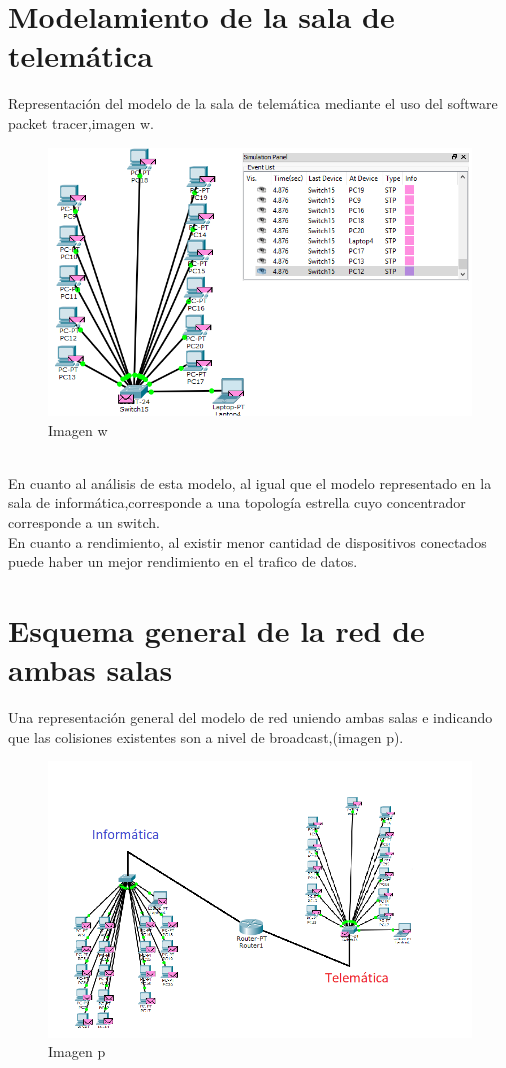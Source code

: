 \documentclass[spanish]{udpreport}
\begin{document}
\section{Modelamiento de la sala de telemática}
Representación del modelo de la sala de telemática mediante el uso del software packet tracer,imagen w.
\\[0.2cm]
\begin{figure}[h]
    \centering
    \includegraphics[scale=0.8]{images/telematica111.png}
    \caption{Imagen w}
    \label{fig:my_label}
\end{figure}
\\[0.4cm]
En cuanto al análisis de esta modelo, al igual que el modelo representado en la sala de informática,corresponde a una topología estrella cuyo concentrador corresponde a un switch.
\\[0.2cm]
En cuanto a rendimiento, al existir menor cantidad de dispositivos conectados puede haber un mejor rendimiento en el trafico de datos.
\newpage
\section{Esquema general de la red de ambas salas}
Una representación general del modelo de red uniendo ambas salas e indicando que las colisiones existentes son a nivel de broadcast,(imagen p).
\\[0.2cm]
\begin{figure}[h]
    \centering
    \includegraphics[scale=0.8]{images/general.png}
    \caption{Imagen p}
    \label{fig:my_label}
\end{figure}
\end{document}
